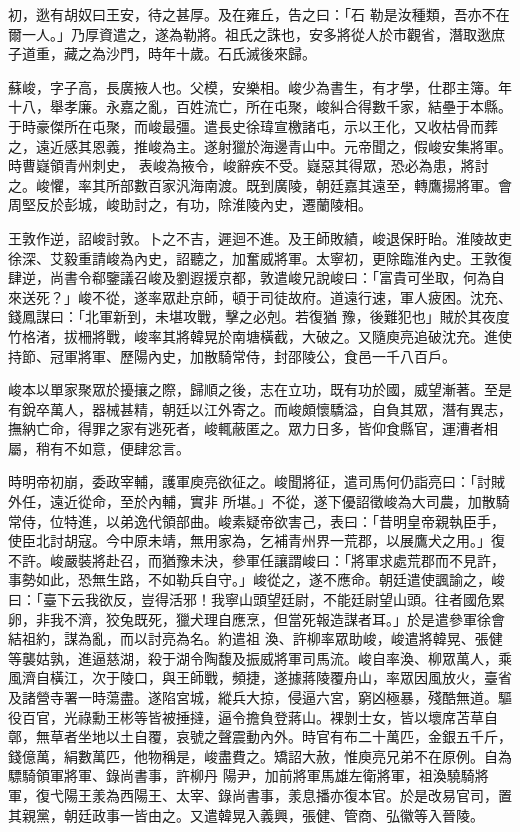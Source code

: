 \begin{pinyinscope}
 初，逖有胡奴曰王安，待之甚厚。及在雍丘，告之曰：「石
 勒是汝種類，吾亦不在爾一人。」乃厚資遣之，遂為勒將。祖氏之誅也，安多將從人於市觀省，潛取逖庶子道重，藏之為沙門，時年十歲。石氏滅後來歸。



 蘇峻，字子高，長廣掖人也。父模，安樂相。峻少為書生，有才學，仕郡主簿。年十八，舉孝廉。永嘉之亂，百姓流亡，所在屯聚，峻糾合得數千家，結壘于本縣。于時豪傑所在屯聚，而峻最彊。遣長史徐瑋宣檄諸屯，示以王化，又收枯骨而葬之，遠近感其恩義，推峻為主。遂射獵於海邊青山中。元帝聞之，假峻安集將軍。時曹嶷領青州刺史，
 表峻為掖令，峻辭疾不受。嶷惡其得眾，恐必為患，將討之。峻懼，率其所部數百家汎海南渡。既到廣陵，朝廷嘉其遠至，轉鷹揚將軍。會周堅反於彭城，峻助討之，有功，除淮陵內史，遷蘭陵相。



 王敦作逆，詔峻討敦。卜之不吉，遲迴不進。及王師敗績，峻退保盱眙。淮陵故吏徐深、艾毅重請峻為內史，詔聽之，加奮威將軍。太寧初，更除臨淮內史。王敦復肆逆，尚書令郗鑒議召峻及劉遐援京都，敦遣峻兄說峻曰：「富貴可坐取，何為自來送死？」峻不從，遂率眾赴京師，頓于司徒故府。道遠行速，軍人疲困。沈充、錢鳳謀曰：「北軍新到，未堪攻戰，擊之必剋。若復猶
 豫，後難犯也」賊於其夜度竹格渚，拔柵將戰，峻率其將韓晃於南塘橫截，大破之。又隨庾亮追破沈充。進使持節、冠軍將軍、歷陽內史，加散騎常侍，封邵陵公，食邑一千八百戶。



 峻本以單家聚眾於擾攘之際，歸順之後，志在立功，既有功於國，威望漸著。至是有銳卒萬人，器械甚精，朝廷以江外寄之。而峻頗懷驕溢，自負其眾，潛有異志，撫納亡命，得罪之家有逃死者，峻輒蔽匿之。眾力日多，皆仰食縣官，運漕者相屬，稍有不如意，便肆忿言。



 時明帝初崩，委政宰輔，護軍庾亮欲征之。峻聞將征，遣司馬何仍詣亮曰：「討賊外任，遠近從命，至於內輔，實非
 所堪。」不從，遂下優詔徵峻為大司農，加散騎常侍，位特進，以弟逸代領部曲。峻素疑帝欲害己，表曰：「昔明皇帝親執臣手，使臣北討胡寇。今中原未靖，無用家為，乞補青州界一荒郡，以展鷹犬之用。」復不許。峻嚴裝將赴召，而猶豫未決，參軍任讓謂峻曰：「將軍求處荒郡而不見許，事勢如此，恐無生路，不如勒兵自守。」峻從之，遂不應命。朝廷遣使諷諭之，峻曰：「臺下云我欲反，豈得活邪！我寧山頭望廷尉，不能廷尉望山頭。往者國危累卵，非我不濟，狡兔既死，獵犬理自應烹，但當死報造謀者耳。」於是遣參軍徐會結祖約，謀為亂，而以討亮為名。約遣祖
 渙、許柳率眾助峻，峻遣將韓晃、張健等襲姑孰，進逼慈湖，殺于湖令陶馥及振威將軍司馬流。峻自率渙、柳眾萬人，乘風濟自橫江，次于陵口，與王師戰，頻捷，遂據蔣陵覆舟山，率眾因風放火，臺省及諸營寺署一時蕩盡。遂陷宮城，縱兵大掠，侵逼六宮，窮凶極暴，殘酷無道。驅役百官，光祿勳王彬等皆被捶撻，逼令擔負登蔣山。裸剝士女，皆以壞席苫草自鄣，無草者坐地以土自覆，哀號之聲震動內外。時官有布二十萬匹，金銀五千斤，錢億萬，絹數萬匹，他物稱是，峻盡費之。矯詔大赦，惟庾亮兄弟不在原例。自為驃騎領軍將軍、錄尚書事，許柳丹
 陽尹，加前將軍馬雄左衛將軍，祖渙驍騎將軍，復弋陽王羕為西陽王、太宰、錄尚書事，羕息播亦復本官。於是改易官司，置其親黨，朝廷政事一皆由之。又遣韓晃入義興，張健、管商、弘徽等入晉陵。




\end{pinyinscope}
